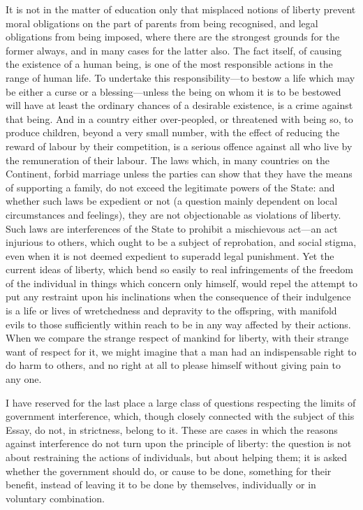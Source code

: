\documentclass[11pt,openany]{book}
\begin{document}
It is not in the matter of education only that misplaced notions of liberty prevent moral obligations on the part of parents from being recognised, and legal obligations from being imposed, where there are the strongest grounds for the former always, and in many cases for the latter also. The fact itself, of causing the existence of a human being, is one of the most responsible actions in the range of human life. To undertake this responsibility---to bestow a life which may be either a curse or a blessing---unless the being on whom it is to be bestowed will have at least the ordinary chances of a desirable existence, is a crime against that being. And in a country either over-peopled, or threatened with being so, to produce children, beyond a very small number, with the effect of reducing the reward of labour by their competition, is a serious offence against all who live by the remuneration of their labour. The laws which, in many countries on the Continent, forbid marriage unless the parties can show that they have the means of supporting a family, do not exceed the legitimate powers of the State: and whether such laws be expedient or not (a question mainly dependent on local circumstances and feelings), they are not objectionable as violations of liberty. Such laws are interferences of the State to prohibit a mischievous act---an act injurious to others, which ought to be a subject of reprobation, and social stigma, even when it is not deemed expedient to superadd legal punishment. Yet the current ideas of liberty, which bend so easily to real infringements of the freedom of the individual in things which concern only himself, would repel the attempt to put any restraint upon his inclinations when the consequence of their indulgence is a life or lives of wretchedness and depravity to the offspring, with manifold evils to those sufficiently within reach to be in any way affected by their actions. When we compare the strange respect of mankind for liberty, with their strange want of respect for it, we might imagine that a man had an indispensable right to do harm to others, and no right at all to please himself without giving pain to any one.

I have reserved for the last place a large class of questions respecting the limits of government interference, which, though closely connected with the subject of this Essay, do not, in strictness, belong to it. These are cases in which the reasons against interference do not turn upon the principle of liberty: the question is not about restraining the actions of individuals, but about helping them; it is asked whether the government should do, or cause to be done, something for their benefit, instead of leaving it to be done by themselves, individually or in voluntary combination.
\end{document}

